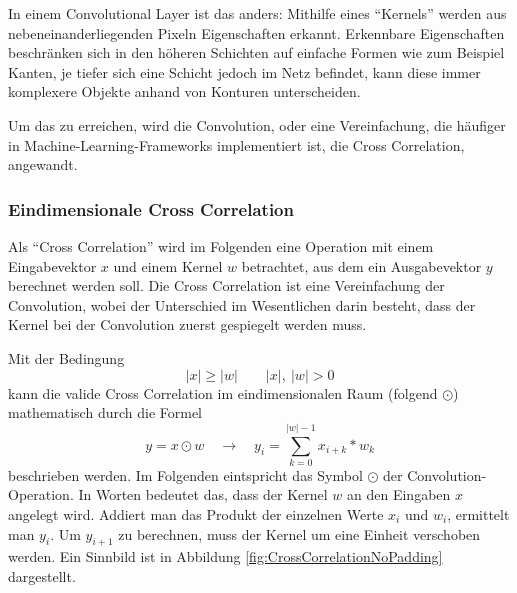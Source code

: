 \documentclass[12pt,a4]{article}
\begin{document}
In einem Convolutional Layer ist das anders: Mithilfe eines \enquote{Kernels} werden aus nebeneinanderliegenden Pixeln Eigenschaften erkannt. Erkennbare Eigenschaften beschränken sich in den höheren Schichten auf einfache Formen wie zum Beispiel Kanten, je tiefer sich eine Schicht jedoch im Netz befindet, kann diese immer komplexere Objekte anhand von Konturen unterscheiden.

Um das zu erreichen, wird die Convolution, oder eine Vereinfachung, die häufiger in Machine-Learning-Frameworks implementiert ist, die Cross Correlation, angewandt.

\subsubsection{Eindimensionale Cross Correlation}
Als \enquote{Cross Correlation} wird im Folgenden eine Operation mit einem Eingabevektor $x$ und einem Kernel $w$ betrachtet, aus dem ein Ausgabevektor $y$ berechnet werden soll. Die Cross Correlation ist eine Vereinfachung der Convolution, wobei der Unterschied im Wesentlichen darin besteht, dass der Kernel bei der Convolution zuerst gespiegelt werden muss.

Mit der Bedingung
\[
|x| \geq |w| \qquad |x|, \: |w| > 0
\]
kann die valide Cross Correlation im eindimensionalen Raum (folgend $\odot$) mathematisch durch die Formel
\begin{equation}
y = x \odot w \quad \rightarrow \quad y_i = \sum\limits_{k=0}^{|w| - 1} x_{i+k} * w_{k}
\end{equation}
beschrieben werden. Im Folgenden eintspricht das Symbol $\odot$ der Convolution-Operation. In Worten bedeutet das, dass der Kernel $w$ an den Eingaben $x$ angelegt wird. Addiert man das Produkt der einzelnen Werte $x_i$ und $w_i$, ermittelt man $y_i$. Um $y_{i+1}$ zu berechnen, muss der Kernel um eine Einheit verschoben werden. Ein Sinnbild ist in Abbildung \ref{fig:CrossCorrelationNoPadding} dargestellt.
\end{document}
